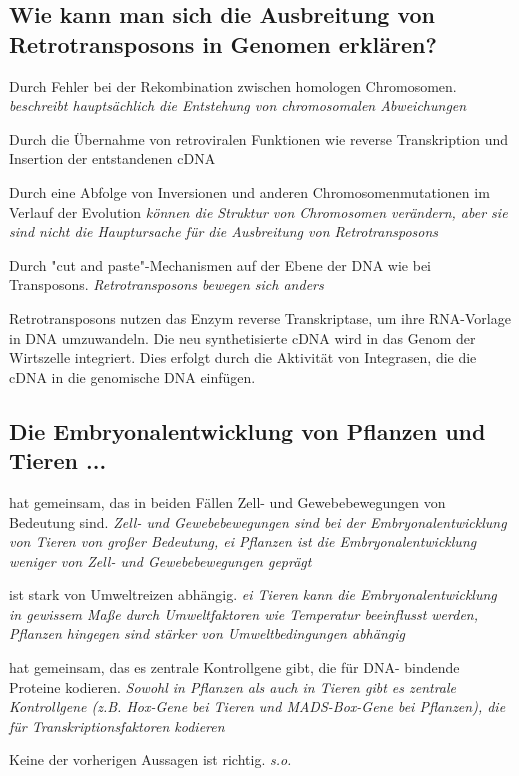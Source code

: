 \documentclass{article}
\newcommand{\cmark}{\ding{51}}%
\newcommand{\done}{\rlap{$\square$}{\raisebox{2pt}{\large\hspace{1pt}\cmark}}%
\hspace{-2.5pt}}
\begin{document}
\subsection*{Wie kann man sich die Ausbreitung von Retrotransposons in Genomen
erklären?}
\begin{todolist}%
\item Durch Fehler bei der Rekombination zwischen homologen
Chromosomen. \textit{\scriptsize beschreibt hauptsächlich die Entstehung von chromosomalen Abweichungen}
\item[\done] Durch die Übernahme von retroviralen Funktionen wie reverse
Transkription und Insertion der entstandenen cDNA
\item Durch eine Abfolge von Inversionen und anderen
Chromosomenmutationen im Verlauf der Evolution \textit{\scriptsize können die Struktur von Chromosomen verändern, aber sie sind nicht die Hauptursache für die Ausbreitung von Retrotransposons}
\item Durch "cut and paste"-Mechanismen auf der Ebene der DNA wie bei
Transposons. \textit{\scriptsize Retrotransposons bewegen sich anders}
\end{todolist}
\begin{mechanism}[title={Ausbreitung von Retrotransposons}]
Retrotransposons nutzen das Enzym reverse Transkriptase, um ihre RNA-Vorlage in DNA umzuwandeln. \newline 
Die neu synthetisierte cDNA wird in das Genom der Wirtszelle integriert. Dies erfolgt durch die Aktivität von Integrasen, die die cDNA in die genomische DNA einfügen.
\end{mechanism}


\subsection*{Die Embryonalentwicklung von Pflanzen und Tieren ...}
\begin{todolist}%
\item hat gemeinsam, das in beiden Fällen Zell- und Gewebebewegungen 
von Bedeutung sind. \textit{\scriptsize Zell- und Gewebebewegungen sind bei der Embryonalentwicklung von Tieren von großer Bedeutung, ei Pflanzen ist die Embryonalentwicklung weniger von Zell- und Gewebebewegungen geprägt}
\item ist stark von Umweltreizen abhängig. \textit{\scriptsize ei Tieren kann die Embryonalentwicklung in gewissem Maße durch Umweltfaktoren wie Temperatur beeinflusst werden, Pflanzen hingegen sind stärker von Umweltbedingungen abhängig}
\item[\done] hat gemeinsam, das es zentrale Kontrollgene gibt, die für DNA-
bindende Proteine kodieren. \textit{\scriptsize Sowohl in Pflanzen als auch in Tieren gibt es zentrale Kontrollgene (z.B. Hox-Gene bei Tieren und MADS-Box-Gene bei Pflanzen), die für Transkriptionsfaktoren kodieren}
\item Keine der vorherigen Aussagen ist richtig. \textit{\scriptsize s.o.}
\end{todolist}
\end{document}
